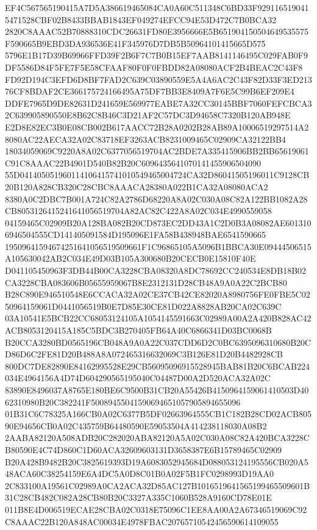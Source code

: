 \documentclass[UTF8,fontset=fandol,zihao=-4,a4paper]{ctexart}
\begin{document}
{{EF4C567565190415A7D5A386619465084CA0A60C511348C6BD33F9291165190415471528CBF02B8433BBAB1843EF049274EFCC94E53D472C7B0BCA32
2820C8AAAC52B70888310CDC26631FD80E3956666E5B651904150504649535575F590665B9EBD3DA936536E41F345976D7DB5B50964101415665D575
5796E1B17D39B69966FFD39F2B6F7C7B0B15EF7AAB8141146495C029FAB0F9DF5586D84F5FE7F5E58CFAAF80F0F0FBDD82A08080ACF2B4BEAC2C43F8
FD92D194C3EFD6D8BF7FAD2C639C03890559E5A4A6AC2C43F82D33F3ED21376CF8BDAF2CE366175724166495A75DF7BB3E8409A7F6E5C99B6EF209E4
DDFE7965D9DE82631D241659E569977EABE7A32CC30145BBF7060FEFCBCA32C639905890550E8B62C8B46C3D21AF2C57DC3D94658C7320B120AB948E
E2D8E82EC3B0E08CB002B617AACC72B28A0202B28AB89A10006519297514A28080AC22AECA32A02C83718EF3263ACB8231009465C02909CA32122BB4
18034059069C9220A8A02C6377056519704AC2BDE7A335415906BB2BB65619061C91C8AAAC22B4901D540B82B20C6096435641070141455906504090
55D041405051960114106415741010549465004724CA32D86041505196011C9128CB20B120A828CB320C28CBC8AAACA28380A022B1CA32A08080ACA2
8380A0C2DBC7B001A724C82A2786D68220A8A02C030A08C82A122BB1082A28CB8053126415241641056519704A82AC82C422A8A02C034E4990559058
04159465C02909B20A128BA082B20CD873EC2DD43A1C2D0B3A08082AE6013106946504555CD141405091584D195096E1FA58B438948BAE6541590665
19509641594674251641056519509661F1C96865105A5096B1BBCA30E09444506515A105630042AB2C034E49D03B105A300680B20CECB0E15810F40E
D041105450963F3DB44B00CA3228CBA08320A8DC78692CC240534E8DB18B02CA3228CBA083606B05655959067B8E2312131D28CB48A9A0A22C2BCB80
B28C890E946510548E6CCACA32A02CE37CB42CE82020A8980756FE0FBE5C0250964159061D0441056519B0E7D85E30CE81D022A8828AB20CA02C639C
03A10541E5BCB22CC68053124105A1054145591663C02989A00A2A420B828AC42ACB8053120415A185C5BDC3B270405FB64A40C6866341D03BC0068B
B20CCA3280BD0565196CB048A9A0A22C037CDD6D2C0BC6395096310680B20CD86D6C2FE81D20B488A8A072465316632069C3B126E81D20B4482928CB
800DC7DE82890E84162995528E29CB56095096915528945BAB81B20C6BCAB224034E4964156A4D74D604290565195040C04487D00A2D520ACA32A02C
83890E8496037A8765E180BE6C9500B31CB20A55426B4150964159061410503D4062310980B20C382241F50089455041590694651057905894655096
01B31C6C78325A166CB0A02C6377B5DF02663964555CB1C182B28CD02ACB80590E94656CB0A02C435759B64480590E59053504A414238118030A08B2
2AABA82120A508ADB20C282020ABA82120A5A02C030A08C82A420BCA3228CB80590E4C74D860C1D60ACA32609603131D3658387E6B15789465C02909
B20A428B9482B20C3825619393D19A6083052945684D088053124195556CB020A548ACA60C38254159E6A4DC5A0D8C01B0A02F5B1FC0298993D19AA0
2C833100A19561C02989A0CA2ACA32D85AC127B1016519641565199465509601B31C28CB482C082A28CB80B20C3327A335C1060B528A9160CD78E01E
011B8E4D006519ECAE28CBA02C0318E75096C1EE8AA00A2A67346519069C92C8AAAC22B120A848AC00034E4978FBAC20765710542456590614109055
}}
\end{document}
